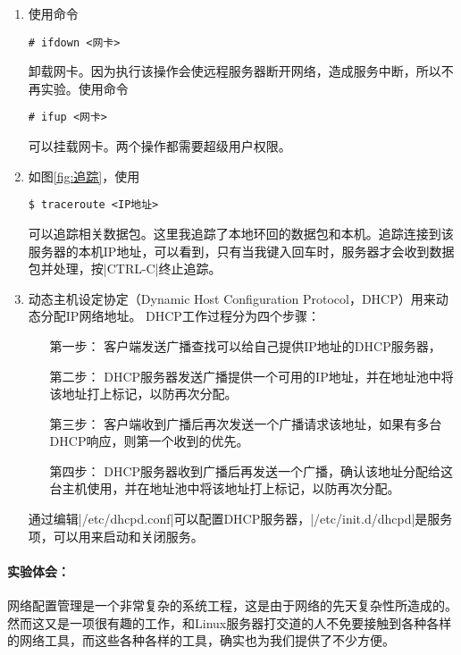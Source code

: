 \documentclass[cs4size,a4paper,nofonts]{ctexart}
\begin{document}
\begin{enumerate}
\item 使用命令
\begin{Verbatim}
# ifdown <网卡>
\end{Verbatim}
卸载网卡。因为执行该操作会使远程服务器断开网络，造成服务中断，所以不再实验。使用命令
\begin{Verbatim}
# ifup <网卡>
\end{Verbatim}
可以挂载网卡。两个操作都需要超级用户权限。

\begin{figure}[htp]
\end{figure}

\item 如图\ref{fig:追踪}，使用
\begin{Verbatim}
$ traceroute <IP地址>
\end{Verbatim}
可以追踪相关数据包。这里我追踪了本地环回的数据包和本机。追踪连接到该服务器的本机IP地址，可以看到，只有当我键入回车时，服务器才会收到数据包并处理，按|CTRL-C|终止追踪。

\item 动态主机设定协定（Dynamic Host Configuration Protocol，DHCP）用来动态分配IP网络地址。
DHCP工作过程分为四个步骤：
\begin{enumerate}
\item[第一步：]客户端发送广播查找可以给自己提供IP地址的DHCP服务器，
\item[第二步：]DHCP服务器发送广播提供一个可用的IP地址，并在地址池中将该地址打上标记，以防再次分配。
\item[第三步：]客户端收到广播后再次发送一个广播请求该地址，如果有多台DHCP响应，则第一个收到的优先。
\item[第四步：]DHCP服务器收到广播后再发送一个广播，确认该地址分配给这台主机使用，并在地址池中将该地址打上标记，以防再次分配。
\end{enumerate}

通过编辑|/etc/dhcpd.conf|可以配置DHCP服务器，|/etc/init.d/dhcpd|是服务项，可以用来启动和关闭服务。

\end{enumerate}

\paragraph{实验体会：}\quad

网络配置管理是一个非常复杂的系统工程，这是由于网络的先天复杂性所造成的。然而这又是一项很有趣的工作，和Linux服务器打交道的人不免要接触到各种各样的网络工具，而这些各种各样的工具，确实也为我们提供了不少方便。
\end{document}
